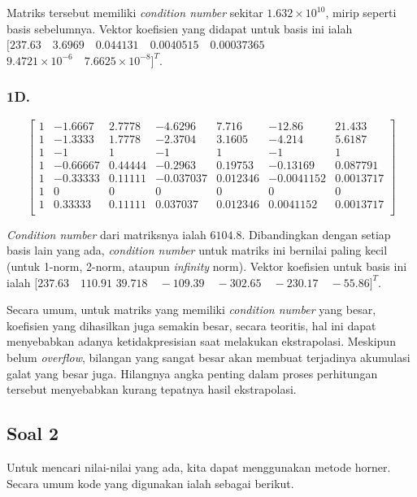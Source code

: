 \documentclass[11pt, a4paper, onecolumn, oneside, final]{report}
\begin{document}
Matriks tersebut memiliki \textit{condition number} sekitar $1.632 \times 10^{10}$, mirip seperti basis sebelumnya. Vektor koefisien yang didapat untuk basis ini ialah $[237.63 \quad 3.6969 \quad 0.044131 \quad 0.0040515 \quad 0.00037365$ $9.4721 \times 10^{-6} \quad 7.6625 \times 10^{-8}]^T$.

\subsubsection*{1D.}

$$
\begin{bmatrix}
1 & -1.6667 & 2.7778 & -4.6296 & 7.716 & -12.86 & 21.433 \\
1 & -1.3333 & 1.7778 & -2.3704 & 3.1605 & -4.214 & 5.6187 \\
1 & -1 & 1 & -1 & 1 & -1 & 1 \\
1 & -0.66667 & 0.44444 & -0.2963 & 0.19753 & -0.13169 & 0.087791 \\
1 & -0.33333 & 0.11111 & -0.037037 & 0.012346 & -0.0041152 & 0.0013717 \\
1 & 0 & 0 & 0 & 0 & 0 & 0 \\
1 & 0.33333 & 0.11111 & 0.037037 & 0.012346 & 0.0041152 & 0.0013717 \\
\end{bmatrix}
$$

\textit{Condition number} dari matriksnya ialah $6104.8$. Dibandingkan dengan setiap basis lain yang ada, \textit{condition number} untuk matriks ini bernilai paling kecil (untuk 1-norm, 2-norm, ataupun \textit{infinity} norm). Vektor koefisien untuk basis ini ialah $[237.63 \quad 110.91$ $39.718 \quad -109.39 \quad -302.65 \quad -230.17 \quad -55.86]^T$.

Secara umum, untuk matriks yang memiliki \textit{condition number} yang besar, koefisien yang dihasilkan juga semakin besar, secara teoritis, hal ini dapat menyebabkan adanya ketidakpresisian saat melakukan ekstrapolasi. Meskipun belum \textit{overflow}, bilangan yang sangat besar akan membuat terjadinya akumulasi galat yang besar juga. Hilangnya angka penting dalam proses perhitungan tersebut menyebabkan kurang tepatnya hasil ekstrapolasi.

\subsection*{Soal 2}

Untuk mencari nilai-nilai yang ada, kita dapat menggunakan metode horner. Secara umum kode yang digunakan ialah sebagai berikut.
\end{document}
